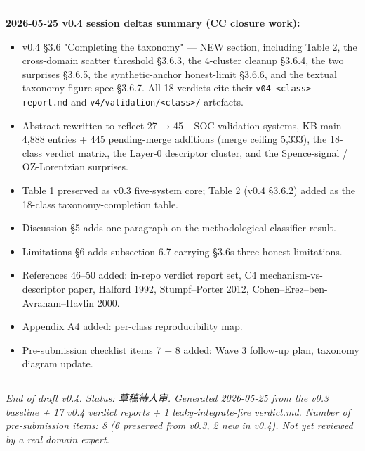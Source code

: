 \documentclass[
  11pt]{article}
\providecommand{\tightlist}{%
  \setlength{\itemsep}{0pt}\setlength{\parskip}{0pt}}
\begin{document}
\begin{center}\rule{0.5\linewidth}{0.5pt}\end{center}

\textbf{2026-05-25 v0.4 session deltas summary (CC closure work):}

\begin{itemize}
\tightlist
\item
  v0.4 §3.6 "Completing the taxonomy" --- NEW section, including
  Table 2, the cross-domain scatter threshold §3.6.3, the 4-cluster
  cleanup §3.6.4, the two surprises §3.6.5, the synthetic-anchor
  honest-limit §3.6.6, and the textual taxonomy-figure spec §3.6.7. All
  18 verdicts cite their \texttt{v04-<class>-report.md} and
  \texttt{v4/validation/<class>/} artefacts.
\item
  Abstract rewritten to reflect 27 → 45+ SOC validation systems, KB
  main 4,888 entries + 445 pending-merge additions (merge ceiling
  5,333), the 18-class verdict matrix, the Layer-0 descriptor cluster,
  and the Spence-signal / OZ-Lorentzian surprises.
\item
  Table 1 preserved as v0.3 five-system core; Table 2 (v0.4 §3.6.2)
  added as the 18-class taxonomy-completion table.
\item
  Discussion §5 adds one paragraph on the methodological-classifier
  result.
\item
  Limitations §6 adds subsection 6.7 carrying §3.6\textquotesingle s
  three honest limitations.
\item
  References 46--50 added: in-repo verdict report set, C4
  mechanism-vs-descriptor paper, Halford 1992, Stumpf--Porter 2012,
  Cohen--Erez--ben-Avraham--Havlin 2000.
\item
  Appendix A4 added: per-class reproducibility map.
\item
  Pre-submission checklist items 7 + 8 added: Wave 3 follow-up plan,
  taxonomy diagram update.
\end{itemize}

\begin{center}\rule{0.5\linewidth}{0.5pt}\end{center}

\emph{End of draft v0.4. Status: 草稿待人审. Generated 2026-05-25 from
the v0.3 baseline + 17 v0.4 verdict reports + 1 leaky-integrate-fire
verdict.md. Number of pre-submission items: 8 (6 preserved from v0.3,
2 new in v0.4). Not yet reviewed by a real domain expert.}
\end{document}
